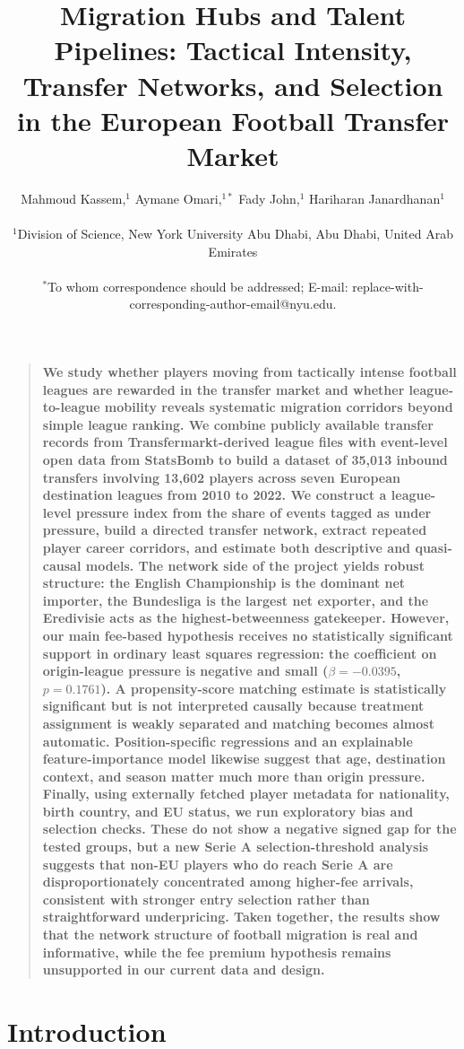 \documentclass[12pt]{article}
\title{Migration Hubs and Talent Pipelines: Tactical Intensity, Transfer Networks, and Selection in the European Football Transfer Market}
\author
{Mahmoud Kassem,$^{1}$ Aymane Omari,$^{1\ast}$ Fady John,$^{1}$ Hariharan Janardhanan$^{1}$\\
\\
\normalsize{$^{1}$Division of Science, New York University Abu Dhabi, Abu Dhabi, United Arab Emirates}\\
\\
\normalsize{$^\ast$To whom correspondence should be addressed; E-mail: replace-with-corresponding-author-email@nyu.edu.}
}
\date{}
\newenvironment{sciabstract}{%
\begin{quote} \bf}
{\end{quote}}
\begin{document}
\baselineskip24pt
\maketitle

\begin{sciabstract}
We study whether players moving from tactically intense football leagues are rewarded in the transfer market and whether league-to-league mobility reveals systematic migration corridors beyond simple league ranking. We combine publicly available transfer records from Transfermarkt-derived league files with event-level open data from StatsBomb to build a dataset of 35,013 inbound transfers involving 13,602 players across seven European destination leagues from 2010 to 2022. We construct a league-level pressure index from the share of events tagged as under pressure, build a directed transfer network, extract repeated player career corridors, and estimate both descriptive and quasi-causal models. The network side of the project yields robust structure: the English Championship is the dominant net importer, the Bundesliga is the largest net exporter, and the Eredivisie acts as the highest-betweenness gatekeeper. However, our main fee-based hypothesis receives no statistically significant support in ordinary least squares regression: the coefficient on origin-league pressure is negative and small ($\beta=-0.0395$, $p=0.1761$). A propensity-score matching estimate is statistically significant but is not interpreted causally because treatment assignment is weakly separated and matching becomes almost automatic. Position-specific regressions and an explainable feature-importance model likewise suggest that age, destination context, and season matter much more than origin pressure. Finally, using externally fetched player metadata for nationality, birth country, and EU status, we run exploratory bias and selection checks. These do not show a negative signed gap for the tested groups, but a new Serie A selection-threshold analysis suggests that non-EU players who do reach Serie A are disproportionately concentrated among higher-fee arrivals, consistent with stronger entry selection rather than straightforward underpricing. Taken together, the results show that the network structure of football migration is real and informative, while the fee premium hypothesis remains unsupported in our current data and design.
\end{sciabstract}

\section*{Introduction}
\end{document}
